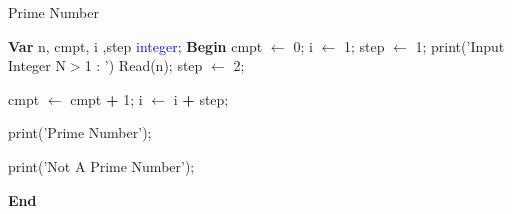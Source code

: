 \begin{algorithm}
\caption{Prime Number}
\begin{algorithmic}[1]
\State \textbf{\textcolor{redPlot}{Var}}
\State n, cmpt, i ,step \textcolor{blue}{integer};
\State  \textbf{\textcolor{redPlot}{Begin}}
\State cmpt $\gets$ 0; 
\State  i $\gets$ 1;
\State  step $\gets$ 1;
\vspace{0.5em}
\State \textcolor{purplePlot!80!black}{print}(\textcolor{blueArea!60!black}{'Input Integer N\(>\)1 : '}) 
\State \textcolor{purplePlot!80!black}{Read}(n);
\vspace{0.5em}
\State step $\gets$ 2;

\EndIf


\State cmpt $\gets$ cmpt \textcolor{redPlot}{ \textbf{+}} 1;
\EndIf
\State i $\gets$ i \textcolor{redPlot}{ \textbf{+}} step; 

\EndWhile

\vspace{0.5em}


\State \textcolor{purplePlot!80!black}{print}(\textcolor{blueArea!60!black}{'Prime Number'});

\Else

\State \textcolor{purplePlot!80!black}{print}(\textcolor{blueArea!60!black}{'Not A Prime Number'});

\EndIf

\State  \textbf{\textcolor{redPlot}{End}}
\end{algorithmic}
\end{algorithm}
